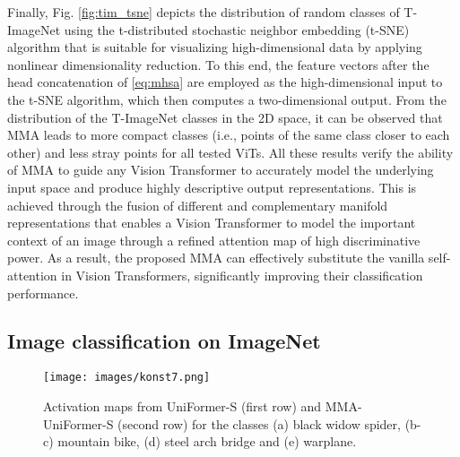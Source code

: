 \documentclass[10pt,twocolumn,letterpaper]{article}
\begin{document}
Finally, Fig. \ref{fig:tim_tsne} depicts the distribution of  random classes of T-ImageNet using the t-distributed stochastic neighbor embedding (t-SNE) algorithm \cite{Author44} that is suitable for visualizing high-dimensional data by applying nonlinear dimensionality reduction. To this end, the feature vectors after the head concatenation of \eqref{eq:mhsa} are employed as the high-dimensional input to the t-SNE algorithm, which then computes a two-dimensional output. From the distribution of the  T-ImageNet classes in the 2D space, it can be observed that MMA leads to more compact classes (i.e., points of the same class closer to each other) and less stray points for all tested ViTs. All these results verify the ability of MMA to guide any Vision Transformer to accurately model the underlying input space and produce highly descriptive output representations. This is achieved through the fusion of different and complementary manifold representations that enables a Vision Transformer to model the important context of an image through a refined attention map of high discriminative power. As a result, the proposed MMA can effectively substitute the vanilla self-attention in Vision Transformers, significantly improving their classification performance.

\subsection{Image classification on ImageNet}

\begin{figure}[t]
  \centering
  \texttt{[image: images/konst7.png]}
  \caption{Activation maps from UniFormer-S (first row) and MMA-UniFormer-S (second row) for the classes (a) black widow spider, (b-c) mountain bike, (d) steel arch bridge and (e) warplane.}
  \label{fig:imnet_vis}
\end{figure}
\end{document}
